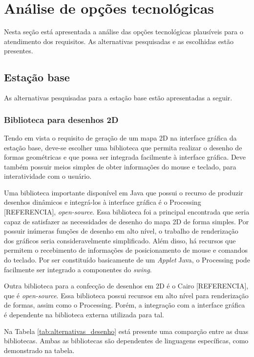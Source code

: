 \section{Análise de opções tecnológicas}

Nesta seção está apresentada a análise das opções tecnológicas plausíveis para o atendimento dos requisitos. As alternativas pesquisadas e as escolhidas estão presentes.

\subsection{Estação base}

As alternativas pesquisadas para a estação base estão apresentadas a seguir.

\subsubsection{Biblioteca para desenhos 2D}
Tendo em vista o requisito de geração de um mapa 2D na interface gráfica da estação base, deve-se escolher uma biblioteca que permita realizar o desenho de formas geométricas e que possa ser integrada facilmente à interface gráfica. Deve também possuir meios simples de obter informações do mouse e teclado, para interatividade com o usuário. 

Uma biblioteca importante disponível em Java que possui o recurso de produzir desenhos dinâmicos e integrá-los à interface gráfica é o Processing [REFERENCIA], \textit{open-source}. Essa biblioteca foi a principal encontrada que seria capaz de satisfazer as necessidades de desenho do mapa 2D de forma simples. Por possuir inúmeras funções de desenho em alto nível, o trabalho de renderização dos gráficos seria consideravelmente simplificado. Além disso, há recursos que permitem o recebimento de informações de posicionamento de mouse e comandos do teclado. Por ser constituído basicamente de um \textit{Applet} Java, o Processing pode facilmente ser integrado a componentes do \textit{swing}.


Outra biblioteca para a confecção de desenhos em 2D é o Cairo [REFERENCIA], que é \textit{open-source}. Essa biblioteca possui recursos em alto nível para renderização de formas, assim como o Processing. Porém, a integração com a interface gráfica é dependente na biblioteca externa utilizada para tal.

Na Tabela \ref{tab:alternativas_desenho} está presente uma comparção entre as duas bibliotecas. Ambas as bibliotecas são dependentes de linguagens específicas, como demonstrado na tabela.


